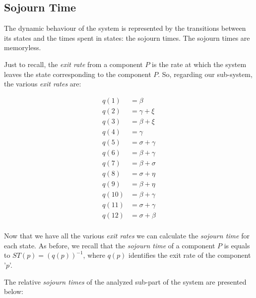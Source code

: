 \documentclass{article}
\begin{document}
\subsection{Sojourn Time}

The dynamic behaviour of the system is represented by the transitions between its states and the times spent in states: the sojourn times. The sojourn times are memoryless.\newline

\par\noindent Just to recall, the \textit{exit rate} from a component \(P\) is the rate at which the system leaves the state corresponding to the component \(P\).\newline
So, regarding our sub-system, the various \textit{exit rates} are:

\begin{align*}
    q(1) &= \beta \\
    q(2) &= \gamma + \xi \\
    q(3) &= \beta + \xi \\
    q(4) &= \gamma \\
    q(5) &= \sigma + \gamma \\
    q(6) &= \beta + \gamma \\
    q(7) &= \beta + \sigma \\
    q(8) &= \sigma + \eta \\
    q(9) &= \beta + \eta \\
    q(10) &= \beta + \gamma \\
    q(11) &= \sigma + \gamma \\
    q(12) &= \sigma + \beta \\
\end{align*}

\noindent Now that we have all the various \textit{exit rates} we can calculate the \textit{sojourn time} for each state. As before, we recall that the \textit{sojourn time} of a component \(P\) is equals to \(ST(p) = (q(p))^{-1}\), where \(q(p)\) identifies the exit rate of the component '\(p\)'.\newline

\par\noindent The relative \textit{sojourn times} of the analyzed sub-part of the system are presented below:
\end{document}
